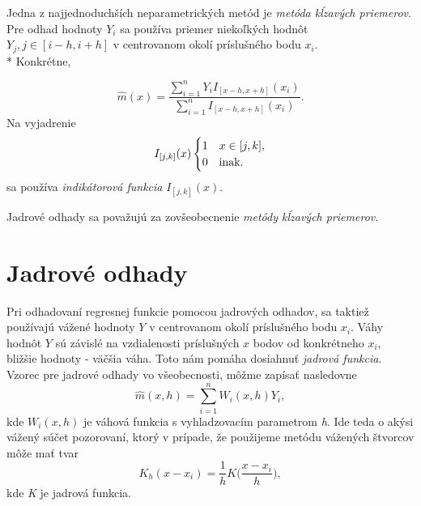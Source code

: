 Jedna z najjednoduchších neparametrických metód je \textit{ metóda kĺzavých priemerov}. Pre odhad hodnoty $Y_i$ sa používa priemer niekoľkých hodnôt $Y_j,  j\in [i-h,i+h]$ v centrovanom okolí príslušného bodu $x_i$. \\*
Konkrétne,
 
\begin{equation}\label{metodaVazenychPriemerov}
\hat{m}(x) = \dfrac{\sum\limits_{i=1}^{n}  Y_i I_{[x - h, x + h]}(x_i)}{\sum\limits_{i=1}^{n} I_{[x - h, x + h]}(x_i)}.
\end{equation}
Na vyjadrenie 
\begin{equation}\label{indikatorovaFunkcia}
I_{[j,k]}(x) \begin{cases}
1 & x \in [j,k], \\ 
0 & $inak.$
\end{cases}
\end{equation}
sa používa \textit{indikátorová funkcia} $I_{[j,k]}(x)$.

Jadrové odhady sa považujú za zovšeobecnenie \textit{metódy kĺzavých priemerov}.


\section{Jadrové odhady}

Pri odhadovaní regresnej funkcie pomocou jadrových odhadov, sa taktiež používajú vážené hodnoty $Y$ v centrovanom okolí príslušného bodu $x_i$. Váhy hodnôt $Y$ sú závislé na vzdialenosti príslušných $x$ bodov od konkrétneho $x_i$, bližšie hodnoty  -  väčšia váha. Toto nám pomáha dosiahnuť \textit{jadrová funkcia}. 
Vzorec pre jadrové odhady vo všeobecnosti, môžme zapísať nasledovne
\begin{equation}
\hat{m}(x,h) = \sum\limits_{i=1}^{n} W_i(x,h)Y_i,
\end{equation}
kde $ W_i(x,h)$ je váhová funkcia s vyhladzovacím parametrom \textit{h}. Ide teda o akýsi vážený súčet pozorovaní, ktorý v prípade, že použijeme metódu vážených štvorcov môže mať tvar
\begin{equation}
K_h(x - x_i) = \frac{1}{h}K\Big(\frac{x-x_i}{h}\Big),
\end{equation}
kde \textit{K} je jadrová funkcia.

